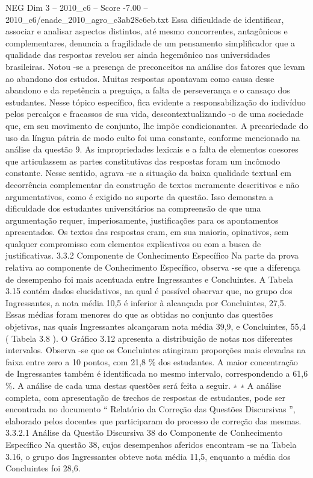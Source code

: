\begin{textsample}{NEG Dim 3 – 2010\_c6 – Score -7.00 – 2010\_c6/enade\_2010\_agro\_c3ab28c6eb.txt}
Essa dificuldade de identificar, associar e analisar aspectos distintos, até mesmo concorrentes, antagônicos e complementares, denuncia a fragilidade de um pensamento simplificador que a qualidade das respostas revelou ser ainda hegemônico nas universidades brasileiras.
Notou -se a presença de preconceitos na análise dos fatores que levam ao abandono dos estudos.
Muitas respostas apontavam como causa desse abandono e da repetência a preguiça, a falta de perseverança e o cansaço dos estudantes.
Nesse tópico específico, fica evidente a responsabilização do indivíduo pelos percalços e fracassos de sua vida, descontextualizando -o de uma sociedade que, em seu movimento de conjunto, lhe impõe condicionantes.
A precariedade do uso da língua pátria de modo culto foi uma constante, conforme mencionado na análise da questão 9.
As impropriedades lexicais e a falta de elementos coesores que articulassem as partes constitutivas das respostas foram um incômodo constante.
Nesse sentido, agrava -se a situação da baixa qualidade textual em decorrência complementar da construção de textos meramente descritivos e não argumentativos, como é exigido no suporte da questão.
Isso demonstra a dificuldade dos estudantes universitários na compreensão de que uma argumentação requer, imperiosamente, justificações para os apontamentos apresentados.
Os textos das respostas eram, em sua maioria, opinativos, sem qualquer compromisso com elementos explicativos ou com a busca de justificativas. 3.3.2 Componente de Conhecimento Específico Na parte da prova relativa ao componente de Conhecimento Específico, observa -se que a diferença de desempenho foi mais acentuada entre Ingressantes e Concluintes.
A Tabela 3.15 contém dados elucidativos, na qual é possível observar que, no grupo dos Ingressantes, a nota média 10,5 é inferior à alcançada por Concluintes, 27,5.
Essas médias foram menores do que as obtidas no conjunto das questões objetivas, nas quais Ingressantes alcançaram nota média 39,9, e Concluintes, 55,4 ( Tabela 3.8 ).
O Gráfico 3.12 apresenta a distribuição de notas nos diferentes intervalos.
Observa -se que os Concluintes atingiram proporções mais elevadas na faixa entre zero a 10 pontos, com 21,8 \% dos estudantes.
A maior concentração de Ingressantes também é identificada no mesmo intervalo, correspondendo a 61,6 \%.
A análise de cada uma destas questões será feita a seguir. ∗ ∗ A análise completa, com apresentação de trechos de respostas de estudantes, pode ser encontrada no documento “ Relatório da Correção das Questões Discursivas ”, elaborado pelos docentes que participaram do processo de correção das mesmas. 3.3.2.1 Análise da Questão Discursiva 38 do Componente de Conhecimento Específico Na questão 38, cujos desempenhos aferidos encontram -se na Tabela 3.16, o grupo dos Ingressantes obteve nota média 11,5, enquanto a média dos Concluintes foi 28,6.

\end{textsample}
